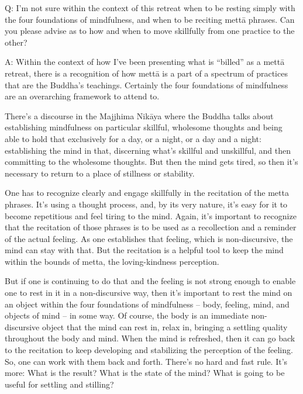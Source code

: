 \vspace{\the\qaskip}
Q: I’m not sure within the context of this retreat when to be resting
simply with the four foundations of mindfulness, and when to be reciting
mettā phrases. Can you please advise as to how and when to move
skillfully from one practice to the other?

\vspace{\the\qaskip}
A: Within the context of how I’ve been presenting what is “billed” as a
mettā retreat, there is a recognition of how mettā is a part of a
spectrum of practices that are the Buddha’s teachings. Certainly the
four foundations of mindfulness are an overarching framework to attend
to.

There’s a discourse in the Majjhima Nikāya where the Buddha talks about
establishing mindfulness on particular skillful, wholesome thoughts and
being able to hold that exclusively for a day, or a night, or a day and
a night: establishing the mind in that, discerning what’s skillful and
unskillful, and then committing to the wholesome thoughts. But then the
mind gets tired, so then it’s necessary to return to a place of
stillness or stability.

One has to recognize clearly and engage skillfully in the recitation of
the metta phrases. It’s using a thought process, and, by its very
nature, it’s easy for it to become repetitious and feel tiring to the
mind. Again, it’s important to recognize that the recitation of those
phrases is to be used as a recollection and a reminder of the actual
feeling. As one establishes that feeling, which is non-discursive, the
mind can stay with that. But the recitation is a helpful tool to keep
the mind within the bounds of metta, the loving-kindness perception.

But if one is continuing to do that and the feeling is not strong enough
to enable one to rest in it in a non-discursive way, then it’s important
to rest the mind on an object within the four foundations of mindfulness
– body, feeling, mind, and objects of mind – in some way. Of course, the
body is an immediate non-discursive object that the mind can rest in,
relax in, bringing a settling quality throughout the body and mind. When
the mind is refreshed, then it can go back to the recitation to keep
developing and stabilizing the perception of the feeling. So, one can
work with them back and forth. There’s no hard and fast rule. It’s more:
What is the result? What is the state of the mind? What is going to be
useful for settling and stilling?

